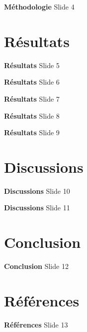 \documentclass[aspectratio=169,10pt]{beamer}
\begin{document}
\begin{frame}{\textbf{Méthodologie}}
    Slide 4
\end{frame}

\section{Résultats}

\begin{frame}{\textbf{Résultats}}
    Slide 5
\end{frame}

\begin{frame}{\textbf{Résultats}}
    Slide 6
\end{frame}

\begin{frame}{\textbf{Résultats}}
    Slide 7
\end{frame}

\begin{frame}{\textbf{Résultats}}
    Slide 8
\end{frame}

\begin{frame}{\textbf{Résultats}}
    Slide 9
\end{frame}

\section{Discussions}

\begin{frame}{\textbf{Discussions}}
    Slide 10
\end{frame}

\begin{frame}{\textbf{Discussions}}
    Slide 11
\end{frame}


\section{Conclusion}
\begin{frame}{\textbf{Conclusion}}
    Slide 12
\end{frame}


\section{Références}
\begin{frame}{\textbf{Références}}
    Slide 13
\end{frame}
\end{document}
